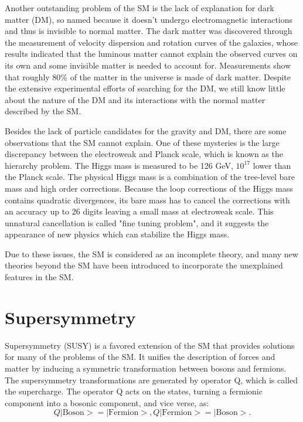 \documentclass[thesis.tex]{subfiles}
\begin{document}
Another outstanding problem of the SM is the lack of explanation for dark matter (DM), so named because it doesn't undergo electromagnetic interactions and thus is invisible to normal matter. The dark matter was discovered through the measurement of velocity dispersion and rotation curves of the galaxies, whose results indicated that the luminous matter cannot explain the observed curves on its own and some invisible matter is needed to account for. Measurements show that roughly 80\% of the matter in the universe is made of dark matter. Despite the extensive experimental efforts of searching for the DM, we still know little about the nature of the DM and its interactions with the normal matter described by the SM. 

Besides the lack of particle candidates for the gravity and DM, there are some observations that the SM  cannot explain. One of these mysteries is the large discrepancy between the electroweak and Planck scale, which is known as the hierarchy problem. The Higgs mass is measured to be 126 GeV, $10^{17}$ lower than the Planck scale. The physical Higgs mass is a combination of the tree-level bare mass and high order corrections. Because the loop corrections of the Higgs mass contains quadratic divergences, its bare mass has to cancel the corrections with an accuracy up to 26 digits leaving a small mass at electroweak scale. This unnatural cancellation is called "fine tuning problem", and it suggests the appearance of new physics which can stabilize the Higgs mass.

Due to these issues, the SM is considered as an incomplete theory, and many new theories beyond the SM have been introduced to incorporate the unexplained features in the SM. 


\section{Supersymmetry}

Supersymmetry (SUSY) is a favored extension of the SM that provides solutions for many of the problems of the SM. 
It unifies the description of forces and matter by inducing a symmetric transformation between bosons and fermions. 
The supersymmetry transformations are generated by operator Q, which is called the supercharge. 
The operator Q acts on the states, turning a fermionic component into a bosonic component, and vice verse, as: 
      \begin{equation}
        Q| \text{Boson} > = | \text{Fermion}>,  Q| \text{Fermion}> = | \text{Boson}>.
      \end{equation} 
\end{document}
